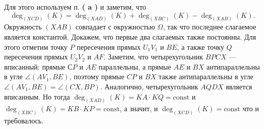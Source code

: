 Для этого используем п. {\bf ( a )} и заметим, что $$\deg_{(XCD)}(K)=\deg_{(XAD)}(K)+\deg_{(XBC)}(K)-\deg_{(XAB)}(K).$$ Окружность $(XAB)$ совпадает с окружностью $\Omega$, так что последнее слагаемое является константой. Докажем, что первые два слагаемых также постоянны. Для этого отметим точку $P$ пересечения прямых $U_1V_1$ и $BE$, а также точку $Q$ пересечения прямых $U_2V_2$ и $AF$. Заметим, что четырехугольник $BPCX$ --- вписанный: прямые $СP$ и $AE$ параллельны, а прямые $AE$ и $BX$ антипараллельны в угле $\angle (AV_1, BE)$, поэтому прямые $CP$ и $BX$ также антипараллельны в угле $\angle (AV_1, BE)=\angle (CX, BP)$. Аналогично, четырехугольник $AQDX$ является вписанным. Но тогда $\deg_{(XAD)}(K)=KA\cdot KQ=\mathrm{const}$ и $\deg_{(XBC)}(K)=KB\cdot KP=\mathrm{const}$, а значит, и $\deg_{(XCD)}(K)=\mathrm{const}$ что и требовалось.

